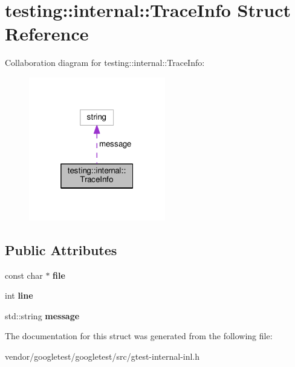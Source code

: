 \hypertarget{structtesting_1_1internal_1_1_trace_info}{}\section{testing\+:\+:internal\+:\+:Trace\+Info Struct Reference}
\label{structtesting_1_1internal_1_1_trace_info}


Collaboration diagram for testing\+:\+:internal\+:\+:Trace\+Info\+:
\nopagebreak
\begin{figure}[H]
\begin{center}
\leavevmode
\includegraphics[width=169pt]{structtesting_1_1internal_1_1_trace_info__coll__graph}
\end{center}
\end{figure}
\subsection*{Public Attributes}
\begin{DoxyCompactItemize}
\item 
\mbox{\label{structtesting_1_1internal_1_1_trace_info_a5d801209d3c0840aa55cfd4b67504254}} 
const char $\ast$ {\bfseries file}
\item 
\mbox{\label{structtesting_1_1internal_1_1_trace_info_ae9d269de1b77f4a3180d0d34acb4d7ff}} 
int {\bfseries line}
\item 
\mbox{\label{structtesting_1_1internal_1_1_trace_info_a39e74f39ce6d5fdbac799abdb1c27f90}} 
std\+::string {\bfseries message}
\end{DoxyCompactItemize}


The documentation for this struct was generated from the following file\+:\begin{DoxyCompactItemize}
\item 
vendor/googletest/googletest/src/gtest-\/internal-\/inl.\+h\end{DoxyCompactItemize}

